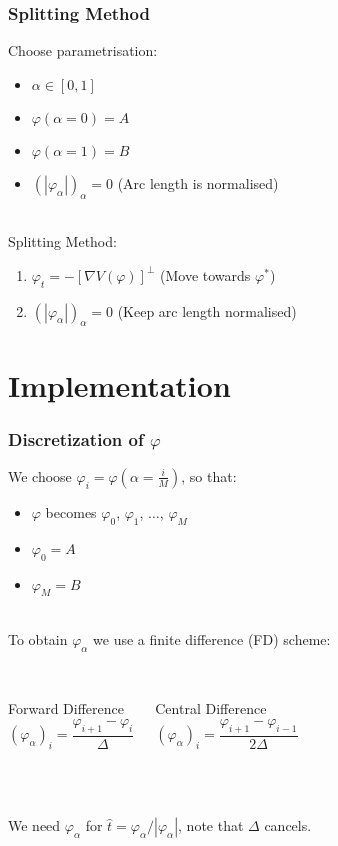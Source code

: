 \documentclass{beamer}
\renewcommand{\phi}{\varphi}
\renewcommand{\(}{\left(}
\renewcommand{\)}{\right)}
\begin{document}
\begin{frame}
\frametitle{Splitting Method}
Choose parametrisation:
\begin{itemize}
\item $\alpha\in [0,1]$
\item $\phi(\alpha=0)=A$ 
\item $\phi(\alpha=1)=B$
\item $(|\phi_\alpha|)_\alpha = 0$ \hspace{3em} (Arc length is normalised)
\end{itemize}
~\\
Splitting Method:
\begin{enumerate}
\item $\phi_t=-[\nabla V(\phi)]^\bot$ \hspace{3em} (Move towards $\phi^*$)
\item $(|\phi_\alpha|)_\alpha = 0$ \hspace{3em} (Keep arc length normalised)
\end{enumerate}
\end{frame}

\section{Implementation}

\begin{frame}
\frametitle{Discretization of $\phi$}
We choose $\phi_i = \phi(\alpha = \frac{i}{M})$, so that:
\begin{itemize}
\item $\phi$ becomes $\phi_0$, $\phi_1$, $\dots$, $\phi_M$
\item  $\phi_0 = A$
\item $\phi_M = B$
\end{itemize}
~\\
To obtain $\phi_\alpha$ we use a finite difference (FD) scheme:\\
~\\
\begin{columns}[c]
\begin{block}{Forward Difference}
$$(\phi_\alpha)_i = \frac{\phi_{i+1}-\phi_i}{\Delta}$$
\end{block}
\begin{block}{Central Difference}
$$(\phi_\alpha)_i = \frac{\phi_{i+1}-\phi_{i-1}}{2\Delta}$$
\end{block}%
\end{columns}
~\\
~\\
We need $\phi_\alpha$ for $\hat t = \phi_\alpha / |\phi_\alpha|$, note that $\Delta$ cancels.
\end{frame}
\end{document}
